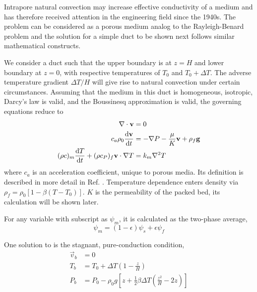 Intrapore natural convection may increase effective conductivity of a medium and has therefore received attention in the engineering field since the 1940s. The problem can be considered as a porous medium analog to the Rayleigh-Benard problem and the solution for a simple duct to be shown next follows similar mathematical constructs.

We consider a duct such that the upper boundary is at $z = H$ and lower boundary at $z=0$, with respective temperatures of $T_0$ and $T_0+\Delta T$. The adverse temperature gradient $\Delta T/H$ will give rise to natural convection under certain circumstances. Assuming that the medium in this duct is homogeneous, isotropic, Darcy's law is valid, and the Boussinesq approximation is valid, the governing equations reduce to
\begin{align}\label{eq:packed-bed-eqns}
\nabla\cdot \mathbf{v}&= 0 \\
c_a\rho_0\frac{\mathrm{d}{\mathbf{v}}}{\mathrm{d}t} &= -\nabla P - \frac{\mu}{K}\mathbf{v} + \rho_f\mathbf{g} \\
(\rho c)_m\frac{\mathrm{d}{T}}{\mathrm{d}t} + (\rho c_P)_f\mathbf{v}\cdot\nabla T &= k_m \nabla^2T
\end{align}
where $c_a$ is an acceleration coefficient, unique to porous media. Its definition is described in more detail in Ref.\cite{Nield2013} . Temperature dependence enters density via $\rho_f = \rho_0[1-\beta(T-T_0)]$. $K$ is the permeability of the packed bed, its calculation will be shown later.

For any variable with subscript as $\psi_m$, it is calculated as the two-phase average,
\begin{equation}
\psi_m = (1-\epsilon)\psi_s + \epsilon \psi_f
\end{equation}

One solution to  is the stagnant, pure-conduction condition,\cite{Nield2013}
\begin{align}
\vec{v}_b &= 0 \\
T_b &= T_0 + \Delta T(1-\frac{z}{H}) \\
P_b &= P_0 - \rho_0 g\left[z + \frac{1}{2}\beta\Delta T\left(\frac{z^2}{H}-2z\right)\right]
\end{align}

